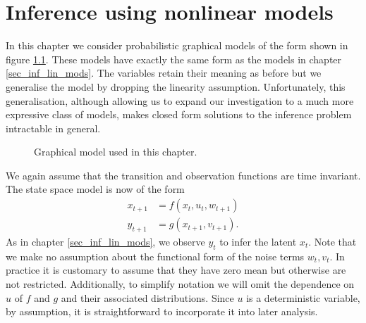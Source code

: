 \chapter{Inference using nonlinear models}
\label{sec_inf_nonlin_mods}
In this chapter we consider probabilistic graphical models of the form shown in figure \ref{fig_nlmod}. These models have exactly the same form as the models in chapter \ref{sec_inf_lin_mods}. The variables retain their meaning as before but we generalise the model by dropping the linearity assumption. Unfortunately, this generalisation, although allowing us to expand our investigation to a much more expressive class of models, makes closed form solutions to the inference problem intractable in general.   
\begin{figure}[H] 
\centering
{}
\caption{Graphical model used in this chapter.}
\label{fig_nlmod}
\end{figure}
We again assume that the transition and observation functions are time invariant. The state space model is now of the form 
\begin{equation}
\begin{aligned}
x_{t+1} &= f(x_t, u_t, w_{t+1}) \\
y_{t+1} &= g(x_{t+1}, v_{t+1}).
\end{aligned}
\label{eq_nlstatespace}
\end{equation}
As in chapter \ref{sec_inf_lin_mods}, we observe $y_t$ to infer the latent $x_t$. Note that we make no assumption about the functional form of the noise terms $w_t,v_t$. In practice it is customary to assume that they have zero mean but otherwise are not restricted. Additionally, to simplify notation we will omit the dependence on $u$ of $f$ and $g$ and their associated distributions. Since $u$ is a deterministic variable, by assumption, it is straightforward to incorporate it into later analysis. 

